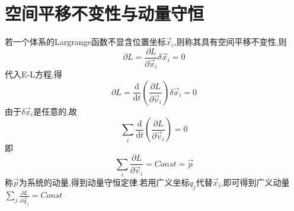 \section{空间平移不变性与动量守恒}
若一个体系的Largrange函数不显含位置坐标$\vec{x}_i$,则称其具有空间平移不变性,则
\begin{equation}
\partial L = 
\frac{\partial L}{\partial\vec{x}_i}\delta \vec{x}_i = 0
\end{equation}
代入E-L方程,得
\begin{equation}
\partial L = 
\frac{\mathrm{d}}{\mathrm{d}t}
\left(
\frac{\partial L}{\partial \vec{v}_i}
\right)\delta\vec{x}_i = 0
\end{equation}
由于$\delta\vec{x}_i$是任意的,故
\begin{equation}
\sum_{i}\frac{\mathrm{d}}{\mathrm{d}t}
\left(
\frac{\partial L}{\partial \vec{v}_i}
\right) = 0
\end{equation}
即
\begin{equation}
\sum_{i}\frac{\partial L}{\partial \vec{v}_i} = Const= \vec{p}
\end{equation}
称$\vec{p}$为系统的动量,得到动量守恒定律.若用广义坐标$q_j$代替$\vec{x}_i$,即可得到广义动量$\sum_{j}\frac{\partial L}{\partial \vec{q}_j} = Const$

